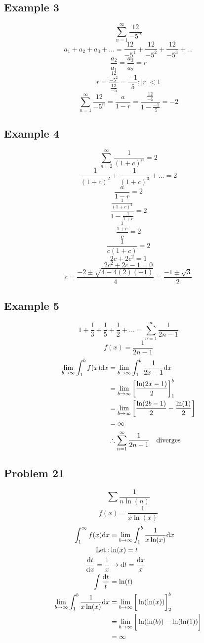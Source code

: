 \documentclass[letterpaper, 12pt]{math}
\begin{document}
\subsection*{Example 3}
\[ \sum_{n=1}^{\infty}\frac{12}{-5^{n}} \]
\[ a_{1}+a_{2}+a_{3}+... =
   \frac{12}{-5^{1}}+\frac{12}{-5^{2}}+\frac{12}{-5^{3}}+... \]
\[ \frac{a_{2}}{a_{1}} = \frac{a_{3}}{a_{2}} = r \]
\[ r = \frac{\frac{12}{-5^{2}}}{\frac{12}{-5}} = \frac{-1}{5}; |r| < 1 \]
\[ \sum_{n=1}^{\infty}\frac{12}{-5^{n}} = \frac{a}{1-r} =
   \frac{\frac{12}{-5}}{1-\frac{-1}{5}} = -2 \]

\subsection*{Example 4}
\[ \sum_{n=2}^{\infty}\frac{1}{(1+c)^{n}} = 2 \]
\[ \frac{1}{(1+c)^{2}}+\frac{1}{(1+c)^{3}}+... = 2 \]
\[ \frac{a}{1-r} = 2 \]
\[ \frac{\frac{1}{(1+c)^{2}}}{1-\frac{1}{1+c}} = 2 \]
\[ \frac{\frac{1}{1+c}}{c} = 2 \]
\[ \frac{1}{c(1+c)} = 2 \]
\[ 2c+2c^{2} = 1 \]
\[ 2c^{2}+2c-1 = 0 \]
\[ c = \frac{-2\pm\sqrt{4-4(2)(-1)}}{4} = \frac{-1\pm\sqrt{3}}{2} \]

\subsection*{Example 5}
\[ 1+\frac{1}{3}+\frac{1}{5}+\frac{1}{2}+... =
   \sum_{n=1}^{\infty}\frac{1}{2n-1} \]
\[ f(x) = \frac{1}{2n-1} \]
\begin{align*}
  \lim_{b\to\infty}\int_{1}^{b}f(x)\mathrm{d}{x} &=
    \lim_{b\to\infty}\int_{1}^{b}\frac{1}{2x-1}\mathrm{d}{x} \\
  &= \lim_{b\to\infty}\bigg[\frac{\ln(2x-1)}{2}\bigg]_{1}^{b} \\
  &= \lim_{b\to\infty}\bigg[\frac{\ln(2b-1)}{2}-\frac{\ln(1)}{2}\bigg] \\
  &= \infty \\
  & \therefore \sum_{n=1}^{\infty}\frac{1}{2n-1} \quad \mathrm{diverges}
\end{align*}

\subsection*{Problem 21}
\[ \sum\frac{1}{n\ln(n)} \]
\[ f(x) = \frac{1}{x\ln(x)} \]
\begin{align*}
  \int_{1}^{\infty}f(x)\mathrm{d}{x} &=
    \lim_{b\to\infty}\int_{1}^{b}\frac{1}{x\ln(x)}\mathrm{d}{x} \\
  \mathrm{Let:} & \ln(x) = t \\
  \frac{\mathrm{d}{t}}{\mathrm{d}{x}} = \frac{1}{x} & \rightarrow \mathrm{d}{t} = \frac{\mathrm{d}{x}}{x} \\
  \int\frac{\mathrm{d}{t}}{t} &= \ln(t) \\
  \lim_{b\to\infty}\int_{1}^{b}\frac{1}{x\ln(x)}\mathrm{d}{x} &=
    \lim_{b\to\infty}\bigg[\ln(\ln(x))\bigg]_{2}^{b} \\
  &= \lim_{b\to\infty}\bigg[\ln(\ln(b))-\ln(\ln(1))\bigg] \\
  &= \infty
\end{align*}
\end{document}
